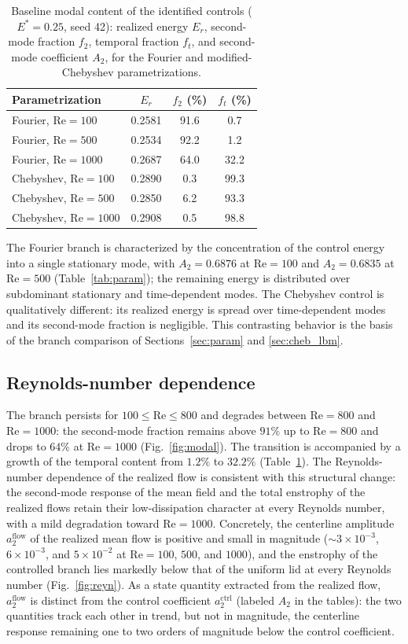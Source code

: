 \documentclass[aip,pof,reprint,superscriptaddress]{revtex4-2}
\newcommand{\re}{\mathrm{Re}}
\begin{document}
\begin{table}[t]
\caption{\label{tab:baseline} Baseline modal content of the identified controls ($E^*=0.25$, seed 42): realized energy $E_r$, second-mode fraction $f_2$, temporal fraction $f_t$, and second-mode coefficient $A_2$, for the Fourier and modified-Chebyshev parametrizations.}
\centering
\begin{tabular}{lccc}
\toprule
Parametrization & $E_r$ & $f_2$ (\%) & $f_t$ (\%) \\
\midrule
Fourier, $\re=100$ & 0.2581 & 91.6 & 0.7 \\
Fourier, $\re=500$ & 0.2534 & 92.2 & 1.2 \\
Fourier, $\re=1000$ & 0.2687 & 64.0 & 32.2 \\
\midrule
Chebyshev, $\re=100$ & 0.2890 & 0.3 & 99.3 \\
Chebyshev, $\re=500$ & 0.2850 & 6.2 & 93.3 \\
Chebyshev, $\re=1000$ & 0.2908 & 0.5 & 98.8 \\
\bottomrule
\end{tabular}
\end{table}

The Fourier branch is characterized by the concentration of the control energy into a single stationary mode, with $A_2=0.6876$ at $\re=100$ and $A_2=0.6835$ at $\re=500$ (Table~\ref{tab:param}); the remaining energy is distributed over subdominant stationary and time-dependent modes. The Chebyshev control is qualitatively different: its realized energy is spread over time-dependent modes and its second-mode fraction is negligible. This contrasting behavior is the basis of the branch comparison of Sections~\ref{sec:param} and \ref{sec:cheb_lbm}.

\subsection{Reynolds-number dependence}\label{sec:redep}

The branch persists for $100\le\re\le800$ and degrades between $\re=800$ and $\re=1000$: the second-mode fraction remains above $91\%$ up to $\re=800$ and drops to $64\%$ at $\re=1000$ (Fig.~\ref{fig:modal}). The transition is accompanied by a growth of the temporal content from $1.2\%$ to $32.2\%$ (Table~\ref{tab:baseline}). The Reynolds-number dependence of the realized flow is consistent with this structural change: the second-mode response of the mean field and the total enstrophy of the realized flows retain their low-dissipation character at every Reynolds number, with a mild degradation toward $\re=1000$. Concretely, the centerline amplitude $a_2^{\mathrm{flow}}$ of the realized mean flow is positive and small in magnitude ($\sim3\times10^{-3}$, $6\times10^{-3}$, and $5\times10^{-2}$ at $\re=100$, $500$, and $1000$), and the enstrophy of the controlled branch lies markedly below that of the uniform lid at every Reynolds number (Fig.~\ref{fig:reyn}). As a state quantity extracted from the realized flow, $a_2^{\mathrm{flow}}$ is distinct from the control coefficient $a_2^{\mathrm{ctrl}}$ (labeled $A_2$ in the tables): the two quantities track each other in trend, but not in magnitude, the centerline response remaining one to two orders of magnitude below the control coefficient.
\end{document}
